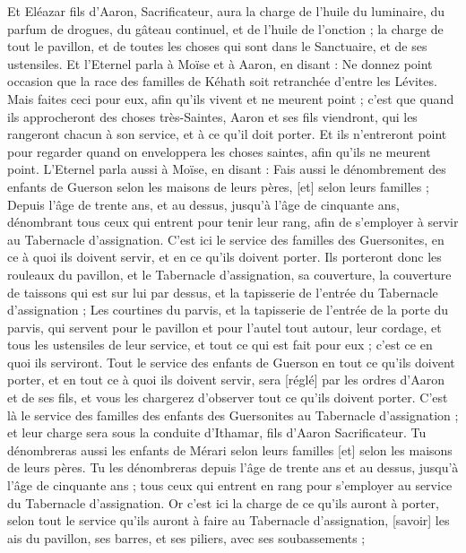 \begin{multicols}{2}
Et Eléazar fils d'Aaron, Sacrificateur, aura la charge de l'huile du luminaire, du parfum de drogues, du gâteau continuel, et de l'huile de l'onction ; la charge de tout le pavillon, et de toutes les choses qui sont dans le Sanctuaire, et de ses ustensiles.
Et l'Eternel parla à Moïse et à Aaron, en disant :
Ne donnez point occasion que la race des familles de Kéhath soit retranchée d'entre les Lévites.
Mais faites ceci pour eux, afin qu'ils vivent et ne meurent point ; c'est que quand ils approcheront des choses très-Saintes, Aaron et ses fils viendront, qui les rangeront chacun à son service, et à ce qu'il doit porter.
Et ils n'entreront point pour regarder quand on enveloppera les choses saintes, afin qu'ils ne meurent point.
L'Eternel parla aussi à Moïse, en disant :
Fais aussi le dénombrement des enfants de Guerson selon les maisons de leurs pères, [et] selon leurs familles ;
Depuis l'âge de trente ans, et au dessus, jusqu'à l'âge de cinquante ans, dénombrant tous ceux qui entrent pour tenir leur rang, afin de s'employer à servir au Tabernacle d'assignation.
C'est ici le service des familles des Guersonites, en ce à quoi ils doivent servir, et en ce qu'ils doivent porter.
Ils porteront donc les rouleaux du pavillon, et le Tabernacle d'assignation, sa couverture, la couverture de taissons qui est sur lui par dessus, et la tapisserie de l'entrée du Tabernacle d'assignation ;
Les courtines du parvis, et la tapisserie de l'entrée de la porte du parvis, qui servent pour le pavillon et pour l'autel tout autour, leur cordage, et tous les ustensiles de leur service, et tout ce qui est fait pour eux ; c'est ce en quoi ils serviront.
Tout le service des enfants de Guerson en tout ce qu'ils doivent porter, et en tout ce à quoi ils doivent servir, sera [réglé] par les ordres d'Aaron et de ses fils, et vous les chargerez d'observer tout ce qu'ils doivent porter.
C'est là le service des familles des enfants des Guersonites au Tabernacle d'assignation ; et leur charge sera sous la conduite d'Ithamar, fils d'Aaron Sacrificateur.
Tu dénombreras aussi les enfants de Mérari selon leurs familles [et] selon les maisons de leurs pères.
Tu les dénombreras depuis l'âge de trente ans et au dessus, jusqu'à l'âge de cinquante ans ; tous ceux qui entrent en rang pour s'employer au service du Tabernacle d'assignation.
Or c'est ici la charge de ce qu'ils auront à porter, selon tout le service qu'ils auront à faire au Tabernacle d'assignation, [savoir] les ais du pavillon, ses barres, et ses piliers, avec ses soubassements ;

\end{multicols}

